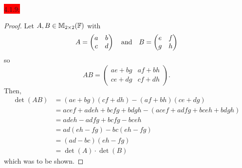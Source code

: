 \documentclass{exam}
\begin{document}
  \colorbox{red}{\underline{$4.1.9$}:}
  \begin{solution}
    \begin{proof}
      Let $A, B \in \mathbb M_{2\times 2}(\mathbb F)$ with 
      \[
        A = \begin{pmatrix}
          a & b \\ c & d 
        \end{pmatrix}
        \quad\text{and}\quad B = \begin{pmatrix}
          e & f \\ g & h
        \end{pmatrix}
      \]
      so 
      \[
        AB = \begin{pmatrix}
          ae + bg & af + bh \\
          ce + dg & cf + dh
        \end{pmatrix}.
      \]
      Then, 
      \begin{align*}
        \det(AB) &= (ae + bg)(cf + dh) - (af + bh)(ce + dg) \\
        &= acef + adeh + bcfg + bdgh - (acef + adfg + bceh + bdgh) \\
        &= adeh - adfg + bcfg - bceh \\
        &= ad(eh - fg) - bc(eh - fg) \\
        &= (ad - bc)(eh - fg) \\
        &= \det(A) \cdot \det(B)
      \end{align*}
      which was to be shown.
    \end{proof}
  \end{solution}
\end{document}
